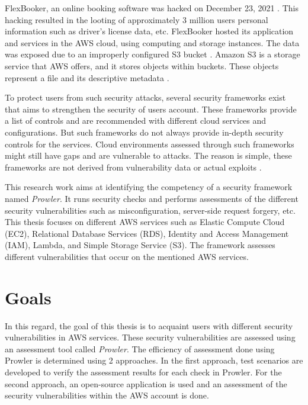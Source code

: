 \par FlexBooker, an online booking software was hacked on December 23, 2021 \cite{6}\cite{7}.
This hacking resulted in the looting of approximately 3
million
users personal information such
as driver's license data, etc.
FlexBooker hosted its application and services in the AWS cloud, using computing and storage instances.
The data was exposed due to an improperly configured S3 bucket \cite{8}.
Amazon S3 is a storage service that AWS offers, and it
stores objects within buckets.
These objects represent a file and its descriptive metadata \cite{9}.




\par  To protect users from such security attacks, several security frameworks exist that aims to strengthen the
security of users account.
These frameworks provide a list of controls and are recommended with different cloud services and
configurations.
But such frameworks do not always provide in-depth security controls for the services.
Cloud
environments assessed through such frameworks might still have gaps and are vulnerable to attacks.
The reason is simple, these frameworks are not
derived from vulnerability data or actual exploits \cite{10}.

\par This research work aims at identifying the competency of a security framework named \textit{Prowler}.
It runs security checks and performs assessments of the different security vulnerabilities such as misconfiguration,
server-side request forgery, etc.
This thesis focuses on different AWS services such as
Elastic Compute Cloud (EC2), Relational Database Services (RDS), Identity and Access Management (IAM), Lambda, and Simple Storage Service (S3). The framework assesses different vulnerabilities that occur on the mentioned AWS services.



\section{Goals}
\par In this regard, the goal of this thesis is to acquaint users with different security vulnerabilities in AWS
services. These security vulnerabilities are assessed using an assessment tool called \textit{Prowler}. The
efficiency of assessment done using Prowler is determined using 2 approaches. In the first approach, test scenarios
are developed to verify the assessment results for each check in Prowler. For the second approach, an open-source
application is used and an assessment of the security vulnerabilities within the AWS account is done.

